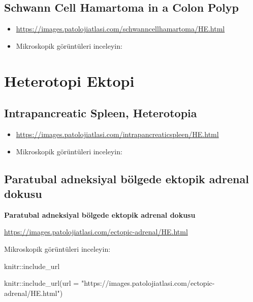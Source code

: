 \documentclass[
  letterpaper,
  DIV=11,
  numbers=noendperiod]{scrreprt}
\newenvironment{Shaded}{}{}
\newcommand{\AttributeTok}[1]{\textcolor[rgb]{0.49,0.56,0.16}{#1}}
\newcommand{\FunctionTok}[1]{\textcolor[rgb]{0.02,0.16,0.49}{#1}}
\newcommand{\NormalTok}[1]{#1}
\newcommand{\SpecialCharTok}[1]{\textcolor[rgb]{0.25,0.44,0.63}{#1}}
\newcommand{\StringTok}[1]{\textcolor[rgb]{0.25,0.44,0.63}{#1}}
\begin{document}
\hypertarget{schwann-cell-hamartoma-in-a-colon-polyp}{%
\section{Schwann Cell Hamartoma in a Colon
Polyp}\label{schwann-cell-hamartoma-in-a-colon-polyp}}

\begin{itemize}
\item
  \url{https://images.patolojiatlasi.com/schwanncellhamartoma/HE.html}
\item
  Mikroskopik görüntüleri inceleyin:
\end{itemize}

\hypertarget{heterotopi-ektopi}{%
\chapter{Heterotopi Ektopi}\label{heterotopi-ektopi}}

\hypertarget{intrapancreatic-spleen-heterotopia}{%
\section{Intrapancreatic Spleen,
Heterotopia}\label{intrapancreatic-spleen-heterotopia}}

\begin{itemize}
\item
  \url{https://images.patolojiatlasi.com/intrapancreaticspleen/HE.html}
\item
  Mikroskopik görüntüleri inceleyin:
\end{itemize}

\hypertarget{paratubal-adneksiyal-buxf6lgede-ektopik-adrenal-dokusu}{%
\section{Paratubal adneksiyal bölgede ektopik adrenal
dokusu}\label{paratubal-adneksiyal-buxf6lgede-ektopik-adrenal-dokusu}}

\textbf{Paratubal adneksiyal bölgede ektopik adrenal dokusu}

\url{https://images.patolojiatlasi.com/ectopic-adrenal/HE.html}

Mikroskopik görüntüleri inceleyin:

knitr::include\_url

\begin{Shaded}
\begin{Highlighting}[]
\NormalTok{knitr}\SpecialCharTok{::}\FunctionTok{include\_url}\NormalTok{(}\AttributeTok{url =} \StringTok{"https://images.patolojiatlasi.com/ectopic{-}adrenal/HE.html"}\NormalTok{)}
\end{Highlighting}
\end{Shaded}
\end{document}
